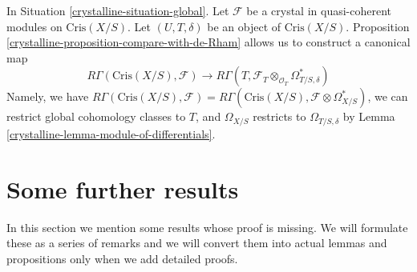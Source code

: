 In Situation \ref{crystalline-situation-global}.
Let $\mathcal{F}$ be a crystal in quasi-coherent modules on
$\text{Cris}(X/S)$. Let $(U, T, \delta)$ be an object of
$\text{Cris}(X/S)$. Proposition \ref{crystalline-proposition-compare-with-de-Rham}
allows us to construct a canonical map
\begin{equation}
\label{equation-restriction}
R\Gamma(\text{Cris}(X/S), \mathcal{F})
\longrightarrow
R\Gamma(T, \mathcal{F}_T \otimes_{\mathcal{O}_T} \Omega^*_{T/S, \delta})
\end{equation}
Namely, we have $R\Gamma(\text{Cris}(X/S), \mathcal{F}) =
R\Gamma(\text{Cris}(X/S), \mathcal{F} \otimes \Omega^*_{X/S})$,
we can restrict global cohomology classes to $T$, and $\Omega_{X/S}$
restricts to $\Omega_{T/S, \delta}$ by
Lemma \ref{crystalline-lemma-module-of-differentials}.

\section{Some further results}
\label{crystalline-section-missing}
In this section we mention some results whose proof is missing.
We will formulate these as a series of remarks and we will convert
them into actual lemmas and propositions only when we add detailed
proofs.

